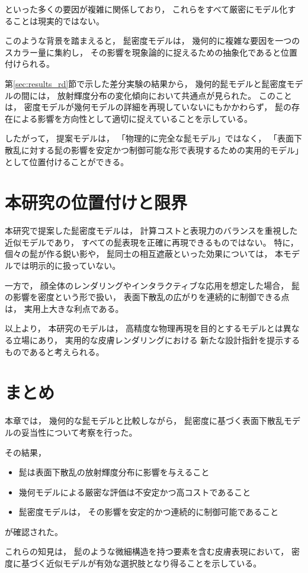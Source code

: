 といった多くの要因が複雑に関係しており，
これらをすべて厳密にモデル化することは現実的ではない。

このような背景を踏まえると，
髭密度モデルは，
幾何的に複雑な要因を一つのスカラー量に集約し，
その影響を現象論的に捉えるための抽象化であると位置付けられる。

第\ref{sec:results_rd}節で示した差分実験の結果から，
幾何的髭モデルと髭密度モデルの間には，
放射輝度分布の変化傾向において共通点が見られた。
このことは，
密度モデルが幾何モデルの詳細を再現していないにもかかわらず，
髭の存在による影響を方向性として適切に捉えていることを示している。

したがって，
提案モデルは，
「物理的に完全な髭モデル」ではなく，
「表面下散乱に対する髭の影響を安定かつ制御可能な形で表現するための実用的モデル」
として位置付けることができる。

\section{本研究の位置付けと限界}

本研究で提案した髭密度モデルは，
計算コストと表現力のバランスを重視した近似モデルであり，
すべての髭表現を正確に再現できるものではない。
特に，
個々の髭が作る鋭い影や，
髭同士の相互遮蔽といった効果については，
本モデルでは明示的に扱っていない。

一方で，
顔全体のレンダリングやインタラクティブな応用を想定した場合，
髭の影響を密度という形で扱い，
表面下散乱の広がりを連続的に制御できる点は，
実用上大きな利点である。

以上より，
本研究のモデルは，
高精度な物理再現を目的とするモデルとは異なる立場にあり，
実用的な皮膚レンダリングにおける
新たな設計指針を提示するものであると考えられる。

\section{まとめ}

本章では，
幾何的な髭モデルと比較しながら，
髭密度に基づく表面下散乱モデルの妥当性について考察を行った。

その結果，

\begin{itemize}
  \item 髭は表面下散乱の放射輝度分布に影響を与えること
  \item 幾何モデルによる厳密な評価は不安定かつ高コストであること
  \item 髭密度モデルは，
        その影響を安定的かつ連続的に制御可能であること
\end{itemize}

が確認された。

これらの知見は，
髭のような微細構造を持つ要素を含む皮膚表現において，
密度に基づく近似モデルが有効な選択肢となり得ることを示している。


